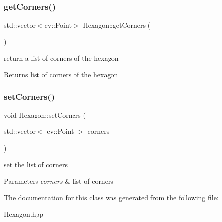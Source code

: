 \subsubsection{\texorpdfstring{get\+Corners()}{getCorners()}}
{\footnotesize\ttfamily std\+::vector$<$cv\+::\+Point$>$ Hexagon\+::get\+Corners (\begin{DoxyParamCaption}{ }\end{DoxyParamCaption})}

return a list of corners of the hexagon \begin{DoxyReturn}{Returns}
list of corners of the hexagon 
\end{DoxyReturn}
\mbox{\label{class_hexagon_a1b5cdb94637901f346373429660af3b1}} 
\subsubsection{\texorpdfstring{set\+Corners()}{setCorners()}}
{\footnotesize\ttfamily void Hexagon\+::set\+Corners (\begin{DoxyParamCaption}\item[{std\+::vector$<$ cv\+::\+Point $>$}]{corners }\end{DoxyParamCaption})}

set the list of corners 
\begin{DoxyParams}{Parameters}
{\em corners} & list of corners \\
\hline
\end{DoxyParams}


The documentation for this class was generated from the following file\+:\begin{DoxyCompactItemize}
\item 
Hexagon.\+hpp\end{DoxyCompactItemize}
